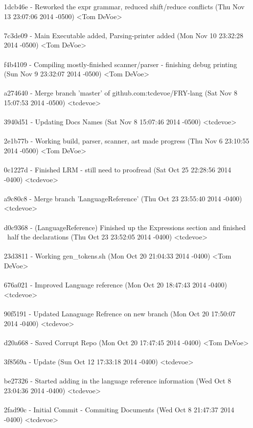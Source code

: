 \documentclass{article}
\newenvironment{allintypewriter}{\ttfamily}{\par}
\begin{document}
\begin{allintypewriter}
1dcb46e - Reworked the expr grammar, reduced shift/reduce conflicts (Thu Nov 13 23:07:06 2014 -0500) <Tom DeVoe>
\\ \\
7c3de09 - Main Executable added, Parsing-printer added (Mon Nov 10 23:32:28 2014 -0500) <Tom DeVoe>
\\ \\
f4b4109 - Compiling mostly-finished scanner/parser - finishing debug printing (Sun Nov 9 23:32:07 2014 -0500) <Tom DeVoe>
\\ \\
a274640 - Merge branch 'master' of github.com:tcdevoe/FRY-lang (Sat Nov 8 15:07:53 2014 -0500) <tcdevoe>
\\ \\
3940d51 - Updating Docs Names (Sat Nov 8 15:07:46 2014 -0500) <tcdevoe>
\\ \\
2e1b77b - Working build, parser, scanner, ast made progress (Thu Nov 6 23:10:55 2014 -0500) <Tom DeVoe>
\\ \\
0c1227d - Finished LRM - still need to proofread (Sat Oct 25 22:28:56 2014 -0400) <tcdevoe>
\\ \\
a9c80c8 - Merge branch 'LanguageReference' (Thu Oct 23 23:55:40 2014 -0400) <tcdevoe>
\\ \\
d0c9368 - (LanguageReference) Finished up the Expressions section and finished ~half the declarations (Thu Oct 23 23:52:05 2014 -0400) <tcdevoe>
\\ \\
23d3811 - Working gen\_tokens.sh (Mon Oct 20 21:04:33 2014 -0400) <Tom DeVoe>
\\ \\
676a021 - Improved Language reference (Mon Oct 20 18:47:43 2014 -0400) <tcdevoe>
\\ \\
90f5191 - Updated Lanaguage Refrence on new branch (Mon Oct 20 17:50:07 2014 -0400) <tcdevoe>
\\ \\
d20a668 - Saved Corrupt Repo (Mon Oct 20 17:47:45 2014 -0400) <Tom DeVoe>
\\ \\
3f8569a - Update (Sun Oct 12 17:33:18 2014 -0400) <tcdevoe>
\\ \\
be27326 - Started adding in the language reference information (Wed Oct 8 23:04:36 2014 -0400) <tcdevoe>
\\ \\
2fad90c - Initial Commit - Commiting Documents (Wed Oct 8 21:47:37 2014 -0400) <tcdevoe>
\end{allintypewriter}
\end{document}
